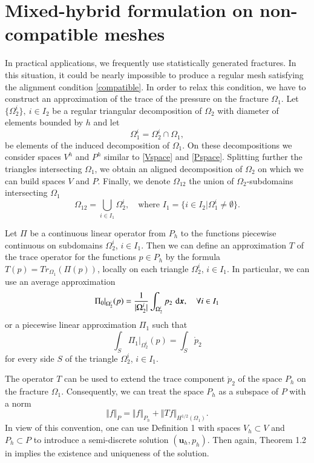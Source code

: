 \documentclass{elsarticle}
\def\d{\,{\rm d}}               %
\def\vc#1{\mathbf{\boldsymbol{#1}}}     %
\def\abs#1{\lvert#1\rvert}
\def\norm#1{\bigl\Vert#1\bigr\Vert} %
\def\vl{{\vc{u}}}
\def\vx{\vc{x}}
\def\dx{\,\d\vx}
\def\mr{\mathring}
\begin{document}
\section{Mixed-hybrid formulation on non-compatible meshes}
In practical applications, we frequently use statistically generated fractures. In this situation,
it could be nearly impossible to produce a regular mesh satisfying the alignment condition
\eqref{compatible}.  In order to relax this condition, we have to construct an approximation of
the trace of the pressure on the fracture $\Omega_1$. Let $\{\Omega_2^i\},\ i\in I_2$ be a regular triangular decomposition of $\Omega_2$ with diameter of elements bounded by $h$ and let
\[
        \Omega_1^i=\Omega_2^i \cap \Omega_1,
\] be elements of the induced decomposition of $\Omega_1$.
On these decompositions we consider spaces $V^h$ and $P^h$ similar to \eqref{Vspace} and \eqref{Pspace}. Splitting further the triangles intersecting $\Omega_1$, we obtain an aligned decomposition of $\Omega_2$ on which we can build spaces $V$ and $P$.
Finally, we denote $\Omega_{12}$ the union of $\Omega_2$-subdomains intersecting $\Omega_1$
\[
  \Omega_{12}=\bigcup_{i\in I_{1}} \Omega_2^i,\quad
   \text{where }  I_{1}=\{i\in I_2| \Omega_1^i  \ne \emptyset \}.
\]

Let $\Pi$ be a continuous linear operator from $P_h$ to the functions piecewise continuous on
subdomains $\Omega_2^i$, $i\in I_1$. Then we can define an approximation $T$ of the trace operator for the functions $p\in P_h$ by the formula $T(p)=Tr_{\Omega_1}(\Pi(p))$, locally on each triangle $\Omega_2^i$, $i\in I_1$. In particular, we can use an average approximation
\[
   \Pi_0 |_{\Omega_2^i}(p) = \frac{1}{\abs{\Omega_2^i}}
                \int_{\Omega_2^i} p_2 \dx,\quad \forall i\in I_{1}
\]
or a piecewise linear approximation $\Pi_1$ such that
\[
  \int_S \Pi_1|_{\Omega_2^i}(p) = \int_S \mr{p}_2
\]
for every side $S$ of the triangle $\Omega_2^i$, $i\in I_{1}$.

The operator $T$ can be used to extend the trace component $\mr{p}_2$ of the space $P_h$ on the fracture $\Omega_1$. Consequently, we  can treat the space $P_h$ as a subspace of $P$ with a norm
\begin{equation}\label{PspaceExtension}
        \norm{f}_P=\norm{f}_{P_h}+\norm{T f}_{H^{1/2}(\Omega_1)}.
\end{equation}
In view of this convention, one can use Definition 1 with spaces $V_h \subset V$ and $P_h\subset P$ to introduce a semi-discrete solution $(\vl_h,p_h)$. Then again,
Theorem 1.2 in \cite{Brezzi} implies the existence and uniqueness of the solution.
\end{document}

